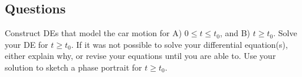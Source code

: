 \documentclass[12pt]{exam}
\begin{document}
\subsection*{Questions}
\begin{questions}

\question[1] Construct DEs that model the car motion for A) $0\le t \le t_0$, and B) $t\ge t_0$. \vfill
\newpage 
\question[1] Solve your DE for $t \ge t_0$. If it was not possible to solve your differential equation(s), either explain why, or revise your equations until you are able to. \vfill
\question[1] Use your solution to sketch a phase portrait for $t \ge t_0$. 
\begin{center}
\end{center}
\end{questions}
\end{document}
